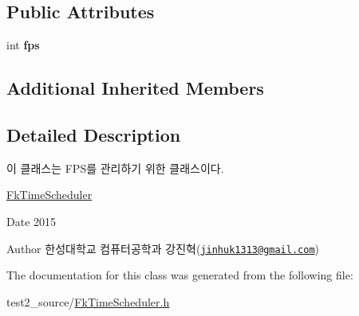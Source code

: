 \subsection*{Public Attributes}
\begin{DoxyCompactItemize}
\item 
\hypertarget{class_fk_time_scheduler_a47f3f5f4759c926401f04f2c6a323aba}{}int {\bfseries fps}\label{class_fk_time_scheduler_a47f3f5f4759c926401f04f2c6a323aba}

\end{DoxyCompactItemize}
\subsection*{Additional Inherited Members}


\subsection{Detailed Description}
이 클래스는 F\+P\+S를 관리하기 위한 클래스이다. 

\hyperlink{class_fk_time_scheduler}{Fk\+Time\+Scheduler} \begin{DoxyDate}{Date}
2015 
\end{DoxyDate}
\begin{DoxyAuthor}{Author}
한성대학교 컴퓨터공학과 강진혁(\href{mailto:jinhuk1313@gmail.com}{\tt jinhuk1313@gmail.\+com}) 
\end{DoxyAuthor}


The documentation for this class was generated from the following file\+:\begin{DoxyCompactItemize}
\item 
test2\+\_\+source/\hyperlink{_fk_time_scheduler_8h}{Fk\+Time\+Scheduler.\+h}\end{DoxyCompactItemize}
